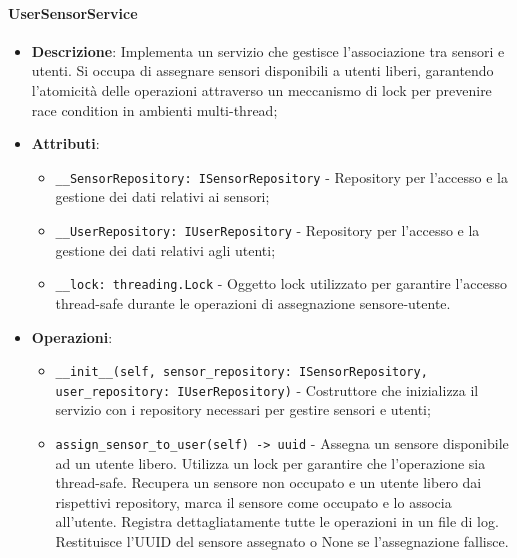 \documentclass[10pt]{article}
\begin{document}
    \paragraph{UserSensorService}
    \begin{itemize} 
    \item \textbf{Descrizione}: Implementa un servizio che gestisce l'associazione tra sensori e utenti. Si occupa di assegnare sensori disponibili a utenti liberi, garantendo l'atomicità delle operazioni attraverso un meccanismo di lock per prevenire race condition in ambienti multi-thread;
    \item \textbf{Attributi}:
    \begin{itemize}
        \item \texttt{\_\_SensorRepository: ISensorRepository} - Repository per l'accesso e la gestione dei dati relativi ai sensori;
        \item \texttt{\_\_UserRepository: IUserRepository} - Repository per l'accesso e la gestione dei dati relativi agli utenti;
        \item \texttt{\_\_lock: threading.Lock} - Oggetto lock utilizzato per garantire l'accesso thread-safe durante le operazioni di assegnazione sensore-utente.
    \end{itemize}
    
    \item \textbf{Operazioni}:
    \begin{itemize}
        \item \texttt{\_\_init\_\_(self, sensor\_repository: ISensorRepository, user\_repository: IUserRepository)} - Costruttore che inizializza il servizio con i repository necessari per gestire sensori e utenti;
        
        \item \texttt{assign\_sensor\_to\_user(self) -> uuid} - Assegna un sensore disponibile ad un utente libero. Utilizza un lock per garantire che l'operazione sia thread-safe. Recupera un sensore non occupato e un utente libero dai rispettivi repository, marca il sensore come occupato e lo associa all'utente. Registra dettagliatamente tutte le operazioni in un file di log. Restituisce l'UUID del sensore assegnato o None se l'assegnazione fallisce.
    \end{itemize}
    \end{itemize}
\end{document}
